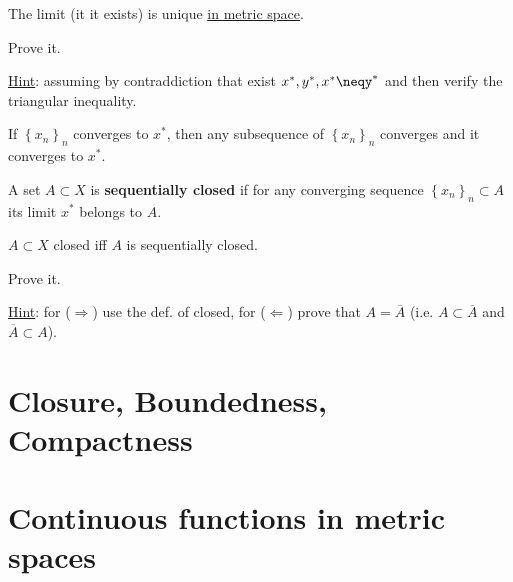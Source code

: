 \begin{prp}
The limit (it it exists) is unique \underline{in metric space}.
\end{prp}

\begin{home}
Prove it.

\underline{Hint}: assuming by contraddiction that exist $x^*,y^*,x^*\neqy^*$ and then verify the triangular inequality.
\newline
\newline
\newline
\newline
\end{home}

\begin{prp}
If $\left\{ x_n \right\}_{n}$ converges to $x^*$, then any subsequence of $\left\{ x_n \right\}_{n}$ converges and it converges to $x^*$.
\end{prp}

\begin{defn}
A set $A\subset X$ is \textbf{sequentially closed} if for any converging sequence $\left\{ x_n \right\}_{n}\subset A$ its limit $x^*$ belongs to $A$.
\end{defn}

\begin{prp}
$A\subset X$ closed iff $A$ is sequentially closed.
\end{prp}

\begin{home}
Prove it.

\underline{Hint}: for ($\Rightarrow$) use the def. of closed, for ($\Leftarrow$) prove that $A=\overline{A}$ (i.e. $A\subset\overline{A}$ and $\overline{A}\subset A$).
\newline
\newline
\newline
\newline
\end{home}


\newpage

\section{Closure, Boundedness, Compactness} %
\label{sec:closure_boundedness_compactness}


\section{Continuous functions in metric spaces} %
\label{sec:continuous_functions_in_metric_spaces}


